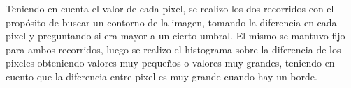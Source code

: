 \begin{figure}[H]
	\centering
\end{figure}	

Teniendo en cuenta el valor de cada pixel, se realizo los dos recorridos con el propósito de buscar un contorno de la imagen, tomando la diferencia en cada pixel y preguntando si era mayor a un cierto umbral. El mismo se mantuvo fijo para ambos recorridos, luego se realizo el histograma sobre la diferencia de los pixeles obteniendo valores muy pequeños o valores muy grandes, teniendo en cuento que la diferencia entre pixel es muy grande cuando hay un borde.

